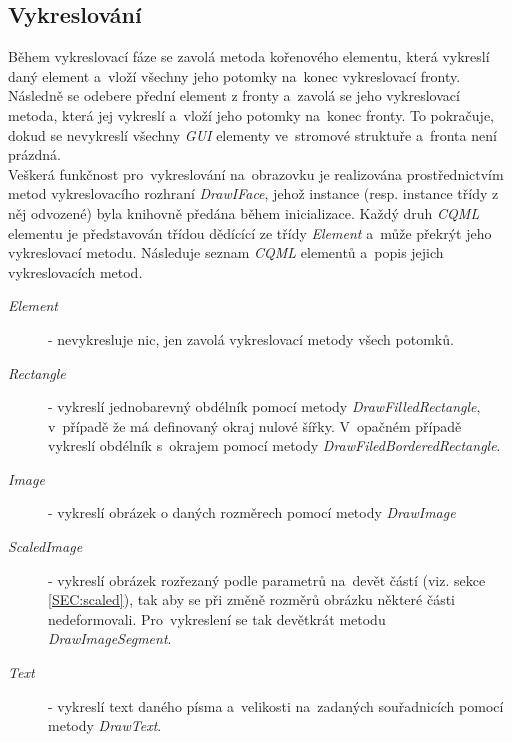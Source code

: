 \documentclass[11pt,twoside,a4paper]{book}
\begin{document}
\subsection{Vykreslování}
Během vykreslovací fáze se zavolá metoda kořenového elementu, která vykreslí daný element a~vloží všechny jeho potomky na~konec vykreslovací fronty. Následně se odebere přední element z fronty a~zavolá se jeho vykreslovací metoda, která jej vykreslí a~vloží jeho potomky na~konec fronty. To pokračuje, dokud se nevykreslí všechny \textit{GUI} elementy ve~stromové struktuře a~fronta není prázdná.\\
Veškerá funkčnost pro~vykreslování na~obrazovku je realizována prostřednictvím metod vykreslovacího rozhraní \textit{DrawIFace}, jehož instance (resp. instance třídy z něj odvozené) byla knihovně předána během inicializace. Každý druh \textit{CQML} elementu je představován třídou dědícící ze třídy \textit{Element} a~může překrýt jeho vykreslovací metodu. Následuje seznam \textit{CQML} elementů a~popis jejich vykreslovacích metod.\\
\begin{description}
\item [\textit{Element}] - nevykresluje nic, jen zavolá vykreslovací metody všech potomků.
\item [\textit{Rectangle}] - vykreslí jednobarevný obdélník pomocí metody \textit{DrawFilledRectangle}, v~případě že má definovaný okraj nulové šířky. V~opačném případě vykreslí obdélník s~okrajem pomocí metody \textit{DrawFiledBorderedRectangle}.
\item [\textit{Image}] - vykreslí obrázek o daných rozměrech pomocí metody \textit{DrawImage}
\item [\textit{ScaledImage}] - vykreslí obrázek rozřezaný podle parametrů na~devět částí (viz. sekce \ref{SEC:scaled}), tak aby se při změně rozměrů obrázku některé části nedeformovali. Pro~vykreslení se tak devětkrát metodu \textit{DrawImageSegment}.
\item [\textit{Text}] - vykreslí text daného písma a~velikosti na~zadaných souřadnicích pomocí metody \textit{DrawText}.
\end{description}

\end{document}
